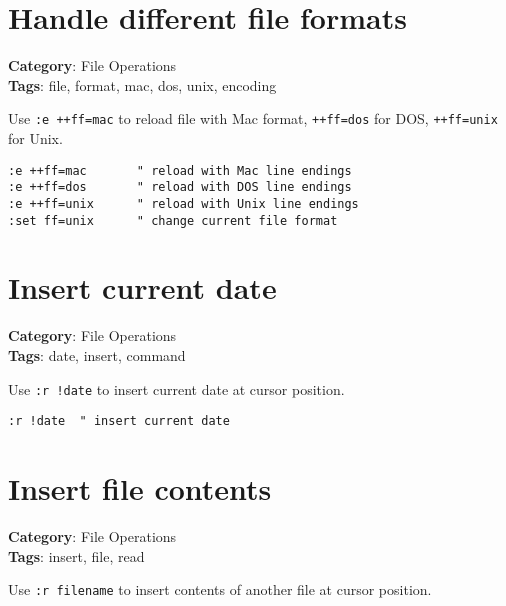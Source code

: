 {{{{{{\section{Handle different file formats}

\textbf{Category}: File Operations\\ \textbf{Tags}: file, format, mac, dos, unix, encoding
\vspace{0.5cm}

Use {\footnotesize \Verb§:e ++ff=mac§} to reload file with Mac format, {\footnotesize \Verb§++ff=dos§} for DOS, {\footnotesize \Verb§++ff=unix§} for Unix.

\begin{Exa*}{}
\begin{Verbatim}[fontsize=\footnotesize, breaklines, breakanywhere]
:e ++ff=mac       " reload with Mac line endings
:e ++ff=dos       " reload with DOS line endings
:e ++ff=unix      " reload with Unix line endings
:set ff=unix      " change current file format
\end{Verbatim}
\end{Exa*}

\section{Insert current date}

\textbf{Category}: File Operations\\ \textbf{Tags}: date, insert, command
\vspace{0.5cm}

Use {\footnotesize \Verb§:r !date§} to insert current date at cursor position.

\begin{Exa*}{}
\begin{Verbatim}[fontsize=\footnotesize, breaklines, breakanywhere]
:r !date  " insert current date
\end{Verbatim}
\end{Exa*}

\section{Insert file contents}

\textbf{Category}: File Operations\\ \textbf{Tags}: insert, file, read
\vspace{0.5cm}

Use {\footnotesize \Verb§:r filename§} to insert contents of another file at cursor position.

}}}}}}
